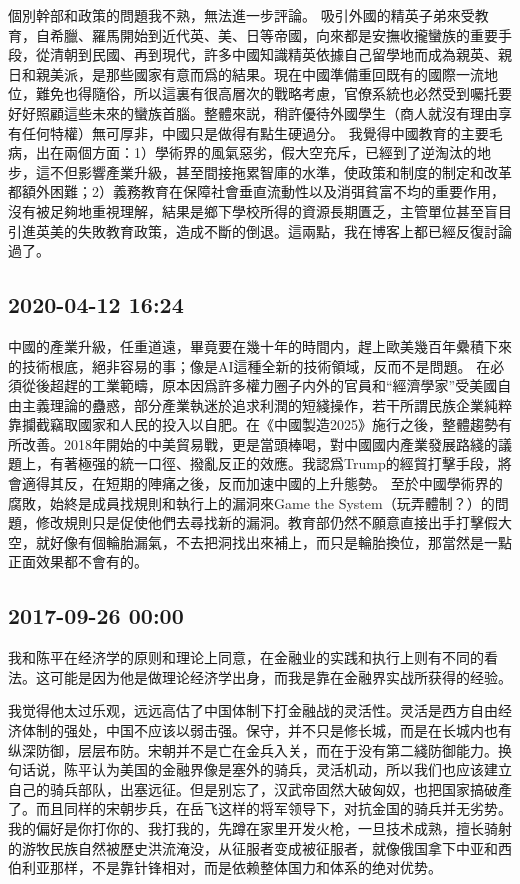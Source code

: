 \documentclass[twocolumn]{ctexart}
\begin{document}
個別幹部和政策的問題我不熟，無法進一步評論。
吸引外國的精英子弟來受教育，自希臘、羅馬開始到近代英、美、日等帝國，向來都是安撫收攏蠻族的重要手段，從清朝到民國、再到現代，許多中國知識精英依據自己留學地而成為親英、親日和親美派，是那些國家有意而爲的結果。現在中國準備重回既有的國際一流地位，難免也得隨俗，所以這裏有很高層次的戰略考慮，官僚系統也必然受到囑托要好好照顧這些未來的蠻族首腦。整體來説，稍許優待外國學生（商人就沒有理由享有任何特權）無可厚非，中國只是做得有點生硬過分。
我覺得中國教育的主要毛病，出在兩個方面：1）學術界的風氣惡劣，假大空充斥，已經到了逆淘汰的地步，這不但影響產業升級，甚至間接拖累智庫的水準，使政策和制度的制定和改革都額外困難；2）義務教育在保障社會垂直流動性以及消弭貧富不均的重要作用，沒有被足夠地重視理解，結果是鄉下學校所得的資源長期匱乏，主管單位甚至盲目引進英美的失敗教育政策，造成不斷的倒退。這兩點，我在博客上都已經反復討論過了。
\subsection*{2020-04-12 16:24}

中國的產業升級，任重道遠，畢竟要在幾十年的時間内，趕上歐美幾百年纍積下來的技術根底，絕非容易的事；像是AI這種全新的技術領域，反而不是問題。
在必須從後超趕的工業範疇，原本因爲許多權力圈子内外的官員和“經濟學家”受美國自由主義理論的蠱惑，部分產業執迷於追求利潤的短綫操作，若干所謂民族企業純粹靠攔截竊取國家和人民的投入以自肥。在《中國製造2025》施行之後，整體趨勢有所改善。2018年開始的中美貿易戰，更是當頭棒喝，對中國國内產業發展路綫的議題上，有著極强的統一口徑、撥亂反正的效應。我認爲Trump的經貿打擊手段，將會適得其反，在短期的陣痛之後，反而加速中國的上升態勢。
至於中國學術界的腐敗，始終是成員找規則和執行上的漏洞來Game the System（玩弄體制？）的問題，修改規則只是促使他們去尋找新的漏洞。教育部仍然不願意直接出手打擊假大空，就好像有個輪胎漏氣，不去把洞找出來補上，而只是輪胎換位，那當然是一點正面效果都不會有的。
\subsection*{2017-09-26 00:00}
我和陈平在经济学的原则和理论上同意，在金融业的实践和执行上则有不同的看法。这可能是因为他是做理论经济学出身，而我是靠在金融界实战所获得的经验。

我觉得他太过乐观，远远高估了中国体制下打金融战的灵活性。灵活是西方自由经济体制的强处，中国不应该以弱击强。保守，并不只是修长城，而是在长城内也有纵深防御，层层布防。宋朝并不是亡在金兵入关，而在于没有第二綫防御能力。换句话说，陈平认为美国的金融界像是塞外的骑兵，灵活机动，所以我们也应该建立自己的骑兵部队，出塞远征。但是别忘了，汉武帝固然大破匈奴，也把国家搞破產了。而且同样的宋朝步兵，在岳飞这样的将军领导下，对抗金国的骑兵并无劣势。我的偏好是你打你的、我打我的，先蹲在家里开发火枪，一旦技术成熟，擅长骑射的游牧民族自然被歷史洪流淹没，从征服者变成被征服者，就像俄国拿下中亚和西伯利亚那样，不是靠针锋相对，而是依赖整体国力和体系的绝对优势。
\end{document}
